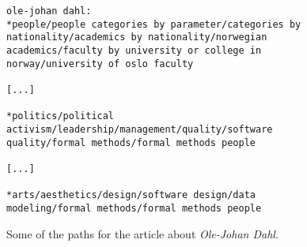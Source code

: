 
\begin{figure}[h]
\centering
\begin{lstlisting}
ole-johan dahl:
*people/people categories by parameter/categories by nationality/academics by nationality/norwegian academics/faculty by university or college in norway/university of oslo faculty

[...]

*politics/political activism/leadership/management/quality/software quality/formal methods/formal methods people

[...]

*arts/aesthetics/design/software design/data modeling/formal methods/formal methods people

\end{lstlisting}
\caption[Example of variety in article paths]{Some of the paths for the article about \emph{Ole-Johan Dahl}.}
\label{fig:olejohandahl_paths}
\end{figure}

